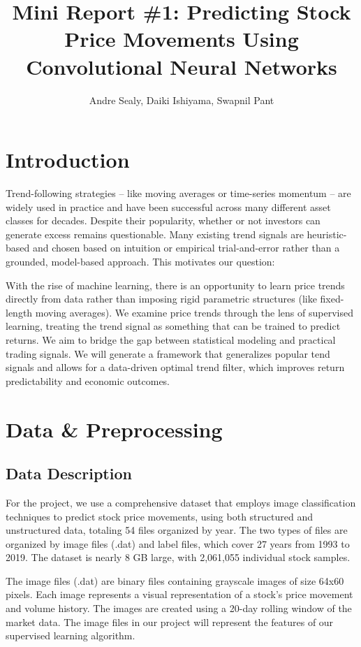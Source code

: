 \documentclass[12pt]{article}
\title{Mini Report \#1: Predicting Stock Price Movements Using Convolutional Neural Networks}
\author{Andre Sealy, Daiki Ishiyama, Swapnil Pant}
\begin{document}
	
\maketitle

\section*{Introduction}

Trend-following strategies -- like moving averages or time-series momentum -- are widely used in practice and have been successful across many different asset classes for decades. Despite their popularity, whether or not investors can generate excess remains questionable. Many existing trend signals are heuristic-based and chosen based on intuition or empirical trial-and-error rather than a grounded, model-based approach. This motivates our question: 

With the rise of machine learning, there is an opportunity to learn price trends directly from data rather than imposing rigid parametric structures (like fixed-length moving averages). We examine price trends through the lens of supervised learning, treating the trend signal as something that can be trained to predict returns. We aim to bridge the gap between statistical modeling and practical trading signals. We will generate a framework that generalizes popular tend signals and allows for a data-driven optimal trend filter, which improves return predictability and economic outcomes.

\section*{Data \& Preprocessing}
\subsection*{Data Description}

For the project, we use a comprehensive dataset that employs image classification techniques to predict stock price movements, using both structured and unstructured data, totaling 54 files organized by year. The two types of files are organized by image files (.dat) and label files, which cover 27 years from 1993 to 2019. The dataset is nearly 8 GB large, with 2,061,055 individual stock samples.

The image files (.dat) are binary files containing grayscale images of size 64x60 pixels. Each image represents a visual representation of a stock's price movement and volume history. The images are created using a 20-day rolling window of the market data. The image files in our project will represent the features of our supervised learning algorithm.
\end{document}
